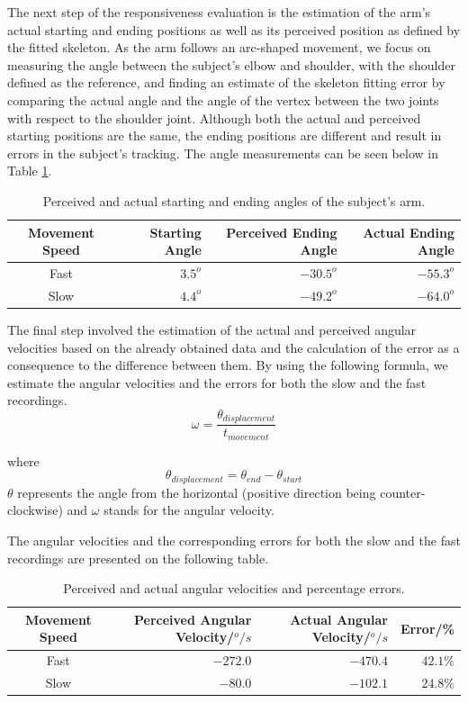 \documentclass[11pt,a4paper]{article}
\begin{document}
\noindent
The next step of the responsiveness evaluation is the estimation of the arm's actual starting and ending positions as well as its perceived position as defined by the fitted skeleton. As the arm follows an arc-shaped movement, we focus on measuring the angle between the subject's elbow and shoulder, with the shoulder  defined as the reference, and finding an estimate of the skeleton fitting error by comparing the actual angle and the angle of the vertex between the two joints with respect to the shoulder joint. Although both the actual and perceived starting positions are the same, the ending positions are different and result in errors in the subject's tracking. The angle measurements can be seen below in Table \ref{angle}.

\begin{table}[H]
\center
\begin{tabular}{| c | r | r | r |}
\hline
Movement Speed & Starting Angle & Perceived Ending Angle & Actual Ending Angle\\
\hline
Fast & $3.5^o$ & $-30.5^o$ & $-55.3^o$\\
Slow & $4.4^o$ & $-49.2^o$ & $-64.0^o$\\
\hline
\end{tabular}
\caption{Perceived and actual starting and ending angles of the subject's arm.}
\label{angle}
\end{table}

\noindent
The final step involved the estimation of the actual and perceived angular velocities based on the already obtained data and the calculation of the error as a consequence to the difference between them. By using the following formula, we estimate the angular velocities and the errors for both the slow and the fast recordings.
\begin{equation}
\omega = \frac{\theta_{displacement}}{t_{movement}} 
\end{equation}

\noindent where \[\theta_{displacement} = \theta_{end} - \theta_{start}\]
$\theta$ represents the angle from the horizontal (positive direction being counter-clockwise) and $\omega$ stands for the angular velocity.
 
\noindent 
The angular velocities and the corresponding errors for both the slow and the fast recordings are presented on the following table.

\begin{table}[H]
\center
\begin{tabular}{| c | r | r | r |}
\hline
Movement Speed & Perceived Angular Velocity/$^o/s$ & Actual Angular Velocity/$^o/s$ & Error/\% \\
\hline
Fast & $-272.0$ & $-470.4$ & $42.1\%$ \\
Slow & $-80.0$ & $-102.1$ & $24.8\%$ \\
\hline
\end{tabular}
\caption{Perceived and actual angular velocities and percentage errors.}
\end{table}
\end{document}
